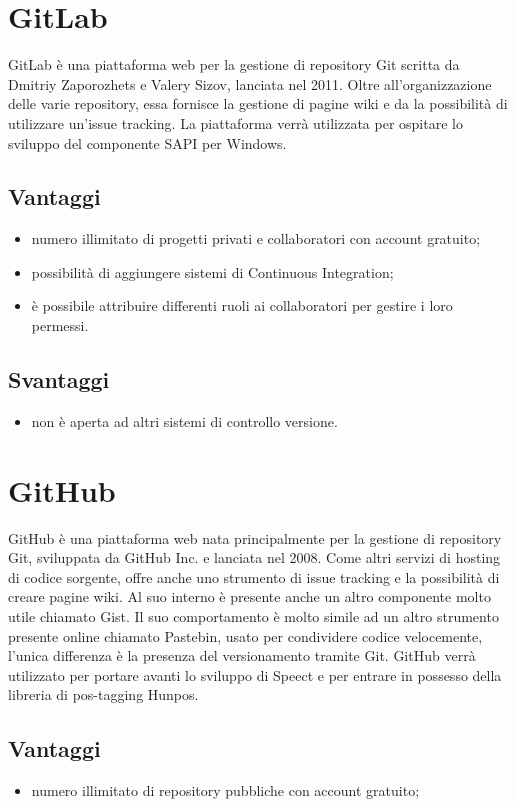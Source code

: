 \section{GitLab}
GitLab è una piattaforma web per la gestione di repository Git scritta da Dmitriy Zaporozhets e Valery Sizov, lanciata nel 2011. Oltre all'organizzazione delle varie repository, essa fornisce la gestione di pagine wiki e da la possibilità di utilizzare un'issue tracking.
La piattaforma verrà utilizzata per ospitare lo sviluppo del componente SAPI per Windows.
\subsection*{Vantaggi}
\begin{itemize}
	\item numero illimitato di progetti privati e collaboratori con account gratuito;
	\item possibilità di aggiungere sistemi di Continuous Integration;
	\item è possibile attribuire differenti ruoli ai collaboratori per gestire i loro permessi.
\end{itemize}
\subsection*{Svantaggi}
\begin{itemize}
	\item non è aperta ad altri sistemi di controllo versione.
\end{itemize}
\section{GitHub}
GitHub è una piattaforma web nata principalmente per la gestione di repository Git, sviluppata da GitHub Inc. e lanciata nel 2008. Come altri servizi di hosting di codice sorgente, offre anche uno strumento di issue tracking e la possibilità di creare pagine wiki. Al suo interno è presente anche un altro componente molto utile chiamato Gist. Il suo comportamento è molto simile ad un altro strumento presente online chiamato Pastebin, usato per condividere codice velocemente, l'unica differenza è la presenza del versionamento tramite Git.
GitHub verrà utilizzato per portare avanti lo sviluppo di Speect e per entrare in possesso della libreria di pos-tagging Hunpos.
\subsection*{Vantaggi}
\begin{itemize}
	\item numero illimitato di repository pubbliche con account gratuito;
\end{itemize}
